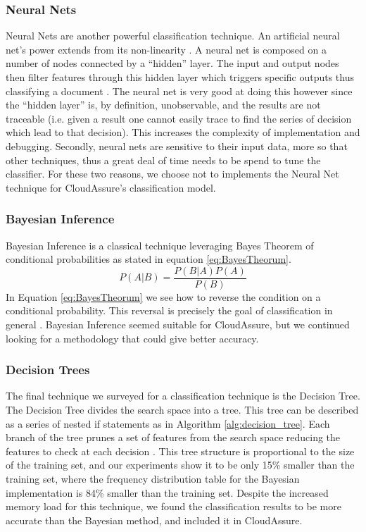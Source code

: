 \subsubsection{Neural Nets}
Neural Nets are another powerful classification technique. An artificial neural
net's power
extends from its non-linearity \autocite{Zhang2000}. A neural net is composed on
a number of nodes connected by a ``hidden'' layer. The input and output nodes
then filter features through this hidden layer which triggers specific outputs
thus classifying a document \autocite{Merkl}. The neural net is very good at
doing this however since the ``hidden layer'' is, by definition, unobservable, and
the results are not traceable (i.e. given a result one cannot easily trace to
find the series of decision which lead to that decision). This increases the
complexity of implementation and debugging. Secondly, neural nets are sensitive
to their input data, more so that other techniques, thus a great deal of time
needs to be spend to tune the classifier. For these two reasons, we choose not
to implements the Neural Net technique for CloudAssure's classification model.

\subsubsection{Bayesian Inference}
Bayesian Inference is a classical technique leveraging Bayes Theorem of
conditional probabilities as stated in equation \ref{eq:BayesTheorum}.
\begin{equation}
    P(A|B) = \frac{P(B | A) P(A)}{P(B)}
    \label{eq:BayesTheorum}
\end{equation}
In Equation \ref{eq:BayesTheorum} we see how to reverse the condition on a conditional probability.
This reversal is precisely the goal of classification in general \autocite{Bishop2009}. Bayesian Inference seemed suitable for CloudAssure, but we continued looking for a methodology that could give better accuracy.

\subsubsection{Decision Trees}
The final technique we surveyed for a classification technique is the Decision
Tree. The Decision Tree divides the search space into a tree. This tree can be
described as a series of nested if statements as in
Algorithm \ref{alg:decision_tree}. Each branch of the
tree prunes a set of features from the search space reducing the features to
check at each decision \autocite{Segaran2008}. This tree structure is
proportional to the size of the training set, and our experiments show it to be
only 15\% smaller than the training set, where the frequency distribution table
for the Bayesian implementation is 84\% smaller than the training set. Despite
the increased memory load for this technique, we found the classification
results to be more accurate than the Bayesian method, and included it in
CloudAssure.

